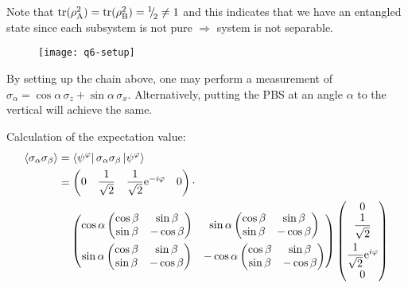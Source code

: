\begin{parts}
	Note that $\textnormal{tr}(\rho_\textnormal{A}^2) = \textnormal{tr}(\rho_\textnormal{B}^2) = {{}^{1}{\mskip -5mu/\mskip -3mu}_{2}} \neq 1$ and this indicates that we have an entangled state since each subsystem is not pure $\Rightarrow$ system is not separable.
	
	\begin{figure}[H]
		\centering
		\texttt{[image: q6-setup]}
	\end{figure}
	By setting up the chain above, one may perform a measurement of $\sigma_\alpha = \cos\alpha\,\sigma_z + \sin\alpha\,\sigma_x$.
	Alternatively, putting the PBS at an angle $\alpha$ to the vertical will achieve the same.
	
	Calculation of the expectation value:
	\begin{align*}
		\avg{\sigma_\alpha \sigma_\beta} &= \bra{\psi^\varphi} \sigma_\alpha \sigma_\beta \ket{\psi^\varphi} \\
		&= \begin{pmatrix}
			0 & \dfrac{1}{\sqrt{2}} & \dfrac{1}{\sqrt{2}} \mathrm{e}^{-i\varphi} & 0
		\end{pmatrix} \cdot \\
		&\phantom{=} \;
		\begin{pmatrix}
			\cos\alpha \begin{pmatrix}
				\cos\beta & \sin\beta \\ \sin\beta & -\cos\beta
			\end{pmatrix}
			& \sin\alpha \begin{pmatrix}
				\cos\beta & \sin\beta \\ \sin\beta & -\cos\beta
			\end{pmatrix} \\[1em]
			\sin\alpha \begin{pmatrix}
				\cos\beta & \sin\beta \\ \sin\beta & -\cos\beta
			\end{pmatrix}
			& -\cos\alpha \begin{pmatrix}
				\cos\beta & \sin\beta \\ \sin\beta & -\cos\beta
			\end{pmatrix}
		\end{pmatrix}
		\begin{pmatrix}
			0 \\ \dfrac{1}{\sqrt{2}} \\[1em] \dfrac{1}{\sqrt{2}} \mathrm{e}^{i\varphi} \\ 0
		\end{pmatrix} \\

\end{align*}
\end{parts}
